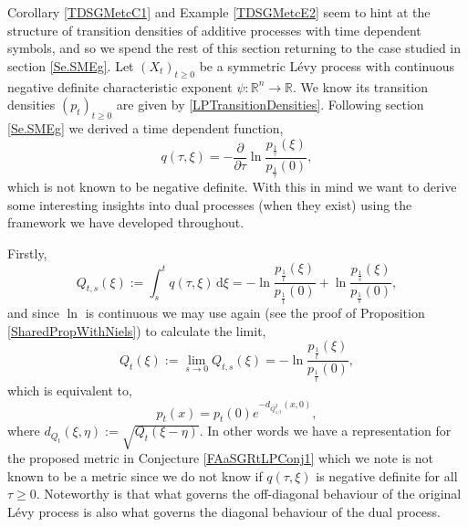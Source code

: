 \documentclass[a4paper, 12pt]{report}
\theoremstyle{cor}
\theoremstyle{remark}
\theoremstyle{definition}
\begin{document}
Corollary \ref{TDSGMetcC1} and Example \ref{TDSGMetcE2} seem to hint at the structure of transition densities of additive processes with time dependent symbols, and so we spend the rest of this section returning to the case studied in section \ref{Se.SMEg}.  Let $(X_t)_{t \ge 0}$ be a symmetric L\'evy process with continuous negative definite characteristic exponent $\psi : \mathbb{R}^n \to \mathbb{R}$.  We know its transition densities $(p_t)_{t \ge 0}$ are given by \eqref{LPTransitionDensities}.  Following section \ref{Se.SMEg} we derived a time dependent function,
$$
q(\tau, \xi) = -\frac{\partial}{\partial\tau}\ln\frac{p_\frac{1}{\tau}(\xi)}{p_\frac{1}{\tau}(0)},
$$
which is not known to be negative definite.  With this in mind we want to derive some interesting insights into dual processes (when they exist) using the framework we have developed throughout.

Firstly,
$$
Q_{t, s}(\xi) := \int_s^tq(\tau, \xi)\,\mathrm{d}\xi = -\ln\frac{p_\frac{1}{t}(\xi)}{p_\frac{1}{t}(0)} + \ln\frac{p_\frac{1}{s}(\xi)}{p_\frac{1}{s}(0)},
$$
and since $\ln$ is continuous we may use \cite[Theorem 14]{DProofPaper} again (see the proof of Proposition \ref{SharedPropWithNiels}) to calculate the limit,
$$
Q_t(\xi) := \lim_{s \to 0}Q_{t, s}(\xi) = -\ln\frac{p_\frac{1}{t}(\xi)}{p_\frac{1}{t}(0)},
$$
which is equivalent to,
$$
p_t(x) = p_t(0)e^{-d_{Q_{1/t}^2}(x, 0)},
$$
where $d_{Q_t}(\xi, \eta) := \sqrt{Q_t(\xi - \eta)}$.  In other words we have a representation for the proposed metric in Conjecture \ref{FAaSGRtLPConj1} which we note is not known to be a metric since we do not know if $q(\tau, \xi)$ is negative definite for all $\tau \ge 0$.  Noteworthy is that what governs the off-diagonal behaviour of the original L\'evy process is also what governs the diagonal behaviour of the dual process.
\end{document}

